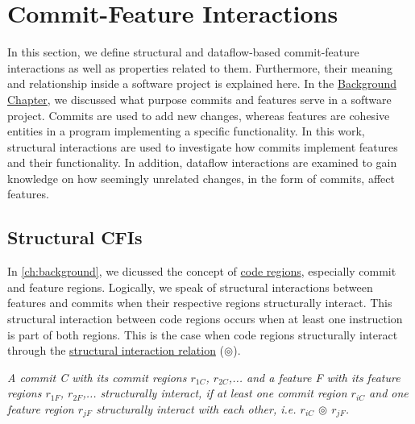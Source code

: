 \chapter{Commit-Feature Interactions}\label{ch:example_chapter}

In this section, we define structural and dataflow-based commit-feature interactions as well as properties related to them.
Furthermore, their meaning and relationship inside a software project is explained here. 
In the \hyperref[ch:background]{Background Chapter}, we discussed what purpose commits and features serve in a software project.
Commits are used to add new changes, whereas features are cohesive entities in a program implementing a specific functionality.
In this work, structural interactions are used to investigate how commits implement features and their functionality.
In addition, dataflow interactions are examined to gain knowledge on how seemingly unrelated changes, in the form of commits, affect features. 

\section{Structural CFIs}\label{sec:structural_cfis}

In \autoref{ch:background}, we dicussed the concept of \hyperref[ch:code_regions]{code regions}, especially commit and feature regions. 
Logically, we speak of structural interactions between features and commits when their respective regions structurally interact. 
This structural interaction between code regions occurs when at least one instruction is part of both regions.
This is the case when code regions structurally interact through the \hyperref[def:structural_relation]{structural interaction relation} ($\circledcirc$).

\begin{definition}\label{def:structural_cfi}
\emph{A commit C with its commit regions $r_{1C}$, $r_{2C}$,... and a feature F with its feature regions $r_{1F}$, $r_{2F}$,... structurally interact, if at least one commit region $r_{iC}$ and one feature region $r_{jF}$ structurally interact with each other, i.e. $r_{iC}$ $\circledcirc$ $r_{jF}$.}
\end{definition}

